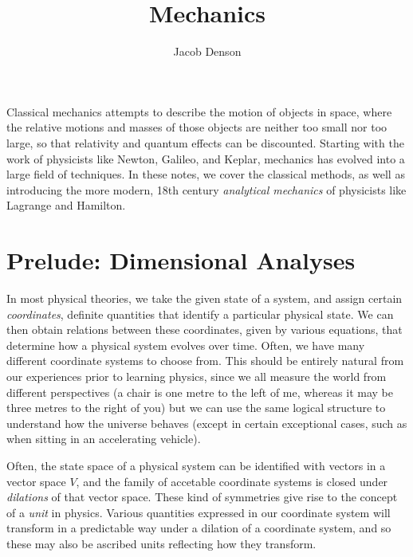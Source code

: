 

\title{Mechanics}
\author{Jacob Denson}




\maketitle



\begin{center}
Classical mechanics attempts to describe the motion of objects in space, where the relative motions and masses of those objects are neither too small nor too large, so that relativity and quantum effects can be discounted. Starting with the work of physicists like Newton, Galileo, and Keplar, mechanics has evolved into a large field of techniques. In these notes, we cover the classical methods, as well as introducing the more modern, 18th century \emph{analytical mechanics} of physicists like Lagrange and Hamilton.
\end{center}

\chapter{Prelude: Dimensional Analyses}

In most physical theories, we take the given state of a system, and assign certain \emph{coordinates}, definite quantities that identify a particular physical state. We can then obtain relations between these coordinates, given by various equations, that determine how a physical system evolves over time. Often, we have many different coordinate systems to choose from. This should be entirely natural from our experiences prior to learning physics, since we all measure the world from different perspectives (a chair is one metre to the left of me, whereas it may be three metres to the right of you) but we can use the same logical structure to understand how the universe behaves (except in certain exceptional cases, such as when sitting in an accelerating vehicle).

Often, the state space of a physical system can be identified with vectors in a vector space $V$, and the family of accetable coordinate systems is closed under \emph{dilations} of that vector space. These kind of symmetries give rise to the concept of a \emph{unit} in physics.
%
Various quantities expressed in our coordinate system will transform in a predictable way under a dilation of a coordinate system, and so these may also be ascribed units reflecting how they transform.


